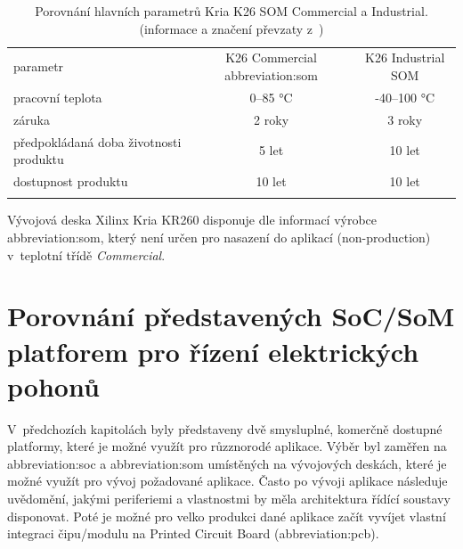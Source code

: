 \documentclass[a4paper, twoside, 11pt]{article}
\begin{document}
					\begin{table}[htbp!]
						\centering
						\caption{Porovnání hlavních parametrů Kria K26 SOM Commercial a Industrial. (informace a značení převzaty z~\cite{kria-k26-som-product-brief})}
						  \vspace*{0.15cm}
						   \resizebox{\textwidth}{!}
							{
								\begin{tabular}{!{\vrule width 2pt} l | c | c !{\vrule width 2pt}}
								parametr & K26 Commercial \gls{abbreviation:som} & K26 Industrial SOM \\
								pracovní teplota & 0–85 °C & -40–100 °C\\ \hline
								záruka & 2 roky & 3 roky\\ \hline
								předpokládaná doba životnosti produktu & 5 let & 10 let\\ \hline 
								dostupnost produktu & 10 let & 10 let \\
								\end{tabular}
							}
						\label{tab:xilinx-kria-som-variants}
					\end{table}

					Vývojová deska Xilinx Kria KR260 disponuje dle informací výrobce \gls{abbreviation:som}, který není určen pro nasazení do aplikací (non-production) v~teplotní třídě \textit{Commercial}. \cite{kria-k26-som-ds}
				

			\section{Porovnání představených SoC/SoM platforem pro řízení elektrických pohonů}
			V~předchozích kapitolách byly představeny dvě smysluplné, komerčně dostupné platformy, které je možné využít pro růzznorodé aplikace. Výběr byl zaměřen na \gls{abbreviation:soc} a \gls{abbreviation:som} umístěných na vývojových deskách, které je možné využít pro vývoj požadované aplikace. Často po vývoji aplikace následuje uvědomění, jakými periferiemi a vlastnostmi by měla architektura řídící soustavy disponovat. Poté je možné pro velko produkci dané aplikace začít vyvíjet vlastní integraci čipu/modulu na Printed Circuit Board (\gls{abbreviation:pcb}).\par
\end{document}
